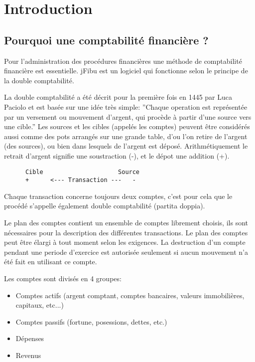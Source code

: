 \documentclass[12pt]{report}
\begin{document}
\tableofcontents

\chapter{Introduction}

\section{Pourquoi une comptabilité financière ?}


Pour l'administration des procédures financières une méthode de comptabilité
financière est essentielle. jFibu est un
logiciel qui fonctionne selon le principe de la double comptabilité.


La double comptabilité a été décrit pour la première fois en 1445 par Luca
Paciolo et est basée sur une idée très simple: ''Chaque operation est
représentée par un versement ou mouvement d'argent, qui procède à partir d'une
source vers une cible.'' Les sources et les cibles (appelés les comptes)
peuvent être considérés aussi comme des pots arrangés sur une grande table,
d'ou l'on retire de l'argent (des sources), ou bien dans lesquels de  l'argent
est déposé.  Arithmétiquement le retrait d'argent signifie une soustraction
(-), et le dépot une addition (+).  

\begin{verbatim}
      Cible                     Source
      +      <--- Transaction ---   -
\end{verbatim}


Chaque transaction concerne toujours deux comptes, c'est pour cela que le
procédé s'appelle également double comptabilité (partita doppia).


Le plan des comptes contient un ensemble de comptes librement choisis, ils sont
nécessaires pour la description des différentes transactions.  Le plan des
comptes peut être élargi à tout moment selon les exigences.  La destruction d'un
compte pendant une periode d'exercice est autorisée seulement si aucun mouvement
n'a été fait en utilisant ce compte.


Les comptes sont divisés en 4 groupes:



\begin{itemize}
\item Comptes actifs (argent comptant, comptes bancaires, valeurs immobilières,
capitaux, etc...)

\item Comptes passifs (fortune, posessions, dettes, etc.)

\item Dépenses

\item Revenus

\end{itemize}
\end{document}
